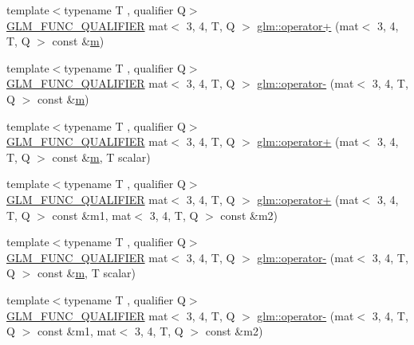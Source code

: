 \begin{DoxyCompactItemize}
\item 
{\footnotesize template$<$typename T , qualifier Q$>$ }\\\hyperlink{setup_8hpp_a33fdea6f91c5f834105f7415e2a64407}{G\+L\+M\+\_\+\+F\+U\+N\+C\+\_\+\+Q\+U\+A\+L\+I\+F\+I\+ER} mat$<$ 3, 4, T, Q $>$ \hyperlink{namespaceglm_a80a5567c9ecbbec46155bf07f9d89ac8}{glm\+::operator+} (mat$<$ 3, 4, T, Q $>$ const \&\hyperlink{_s_d_l__opengl__glext_8h_af593500c283bf1a787a6f947f503a5c2}{m})
\item 
{\footnotesize template$<$typename T , qualifier Q$>$ }\\\hyperlink{setup_8hpp_a33fdea6f91c5f834105f7415e2a64407}{G\+L\+M\+\_\+\+F\+U\+N\+C\+\_\+\+Q\+U\+A\+L\+I\+F\+I\+ER} mat$<$ 3, 4, T, Q $>$ \hyperlink{namespaceglm_a79b94b30ab64f9fb5d7b6ebdaf29adab}{glm\+::operator-\/} (mat$<$ 3, 4, T, Q $>$ const \&\hyperlink{_s_d_l__opengl__glext_8h_af593500c283bf1a787a6f947f503a5c2}{m})
\item 
{\footnotesize template$<$typename T , qualifier Q$>$ }\\\hyperlink{setup_8hpp_a33fdea6f91c5f834105f7415e2a64407}{G\+L\+M\+\_\+\+F\+U\+N\+C\+\_\+\+Q\+U\+A\+L\+I\+F\+I\+ER} mat$<$ 3, 4, T, Q $>$ \hyperlink{namespaceglm_a1a8b82f43c87f6cfba909facca9c04b7}{glm\+::operator+} (mat$<$ 3, 4, T, Q $>$ const \&\hyperlink{_s_d_l__opengl__glext_8h_af593500c283bf1a787a6f947f503a5c2}{m}, T scalar)
\item 
{\footnotesize template$<$typename T , qualifier Q$>$ }\\\hyperlink{setup_8hpp_a33fdea6f91c5f834105f7415e2a64407}{G\+L\+M\+\_\+\+F\+U\+N\+C\+\_\+\+Q\+U\+A\+L\+I\+F\+I\+ER} mat$<$ 3, 4, T, Q $>$ \hyperlink{namespaceglm_a59ca098cc308f717e9036bbfd62de33f}{glm\+::operator+} (mat$<$ 3, 4, T, Q $>$ const \&m1, mat$<$ 3, 4, T, Q $>$ const \&m2)
\item 
{\footnotesize template$<$typename T , qualifier Q$>$ }\\\hyperlink{setup_8hpp_a33fdea6f91c5f834105f7415e2a64407}{G\+L\+M\+\_\+\+F\+U\+N\+C\+\_\+\+Q\+U\+A\+L\+I\+F\+I\+ER} mat$<$ 3, 4, T, Q $>$ \hyperlink{namespaceglm_abd4b7d952364922e319f2c3240a6f799}{glm\+::operator-\/} (mat$<$ 3, 4, T, Q $>$ const \&\hyperlink{_s_d_l__opengl__glext_8h_af593500c283bf1a787a6f947f503a5c2}{m}, T scalar)
\item 
{\footnotesize template$<$typename T , qualifier Q$>$ }\\\hyperlink{setup_8hpp_a33fdea6f91c5f834105f7415e2a64407}{G\+L\+M\+\_\+\+F\+U\+N\+C\+\_\+\+Q\+U\+A\+L\+I\+F\+I\+ER} mat$<$ 3, 4, T, Q $>$ \hyperlink{namespaceglm_a3317241e4c66b496f9578fb97a96dff8}{glm\+::operator-\/} (mat$<$ 3, 4, T, Q $>$ const \&m1, mat$<$ 3, 4, T, Q $>$ const \&m2)

\end{DoxyCompactItemize}
